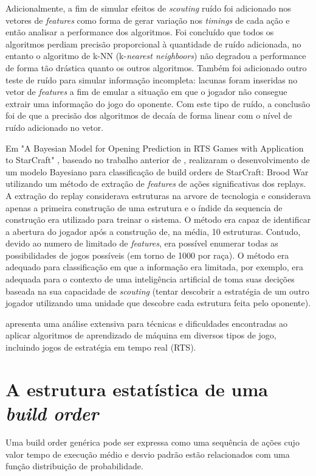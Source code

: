 Adicionalmente, a fim de simular efeitos de \textit{scouting} ruído foi adicionado nos vetores de \textit{features} como forma de gerar variação nos \textit{timings} de cada ação e então analisar a performance dos algoritmos. Foi concluído que todos os algoritmos perdiam precisão proporcional à quantidade de ruído adicionada, no entanto o algoritmo de k-NN (k-\textit{nearest neighboors}) não degradou a performance de forma tão drástica quanto os outros algoritmos. Também foi adicionado outro teste de ruído para simular informação incompleta: lacunas foram inseridas no vetor de \textit{features} a fim de emular a situação em que o jogador não consegue extrair uma informação do jogo do oponente. Com este tipo de ruído, a conclusão foi de que a precisão dos algoritmos de decaía de forma linear com o nível de ruído adicionado no vetor.

Em "A Bayesian Model for Opening Prediction in RTS Games with Application to StarCraft"  \cite{synnaeve2011bayesian1}, baseado no trabalho anterior de \cite{weber2009data}, realizaram o desenvolvimento de um modelo Bayesiano para classificação de build orders de StarCraft: Brood War utilizando um método de extração de \textit{features} de ações significativas dos replays. A extração do replay considerava estruturas na arvore de tecnologia e considerava apenas a primeira construção de uma estrutura e o índide da sequencia de construção era utilizado para treinar o sistema. O método era capaz de identificar a abertura do jogador após a construção de, na média, 10 estruturas. Contudo, devido ao numero de limitado de \textit{features}, era possível enumerar todas as possibilidades de jogos possíveis (em torno de 1000 por raça). O método era adequado para classificação em que a informação era limitada, por exemplo, era adequada para o contexto de uma inteligência artificial de toma suas decições baseada na sua capacidade de \textit{scouting} (tentar descobrir a estratégia de um outro jogador utilizando uma unidade que descobre cada estrutura feita pelo oponente).

\cite{synnaeve2011bayesian2} apresenta uma análise extensiva para técnicas e dificuldades encontradas ao aplicar algoritmos de aprendizado de máquina em diversos tipos de jogo, incluindo jogos de estratégia em tempo real (RTS).

		\section{A estrutura estatística de uma \textit{build order}}
Uma build order genérica pode ser expressa como uma sequência de ações cujo valor tempo de execução médio e desvio padrão estão relacionados com uma função distribuição de probabilidade.

